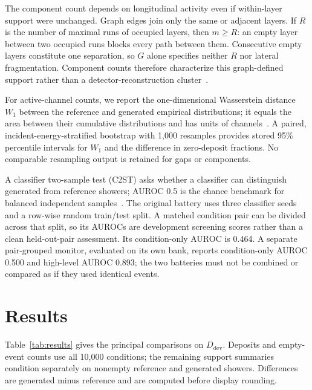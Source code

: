 \documentclass[11pt]{article}
\newcommand{\Ddev}{D_{\mathrm{dev}}}
\begin{document}
The component count depends on longitudinal activity even if within-layer support were unchanged. Graph edges join only the same or adjacent layers. If $R$ is the number of maximal runs of occupied layers, then $m\geq R$: an empty layer between two occupied runs blocks every path between them. Consecutive empty layers constitute one separation, so $G$ alone specifies neither $R$ nor lateral fragmentation. Component counts therefore characterize this graph-defined support rather than a detector-reconstruction cluster~\cite{atlastopocluster}.

For active-channel counts, we report the one-dimensional Wasserstein distance $W_1$ between the reference and generated empirical distributions; it equals the area between their cumulative distributions and has units of channels~\cite{kansalmetrics}. A paired, incident-energy-stratified bootstrap with 1,000 resamples provides stored 95\% percentile intervals for $W_1$ and the difference in zero-deposit fractions. No comparable resampling output is retained for gaps or components.

A classifier two-sample test (C2ST) asks whether a classifier can distinguish generated from reference showers; AUROC 0.5 is the chance benchmark for balanced independent samples~\cite{c2st,kansalmetrics}. The original battery uses three classifier seeds and a row-wise random train/test split. A matched condition pair can be divided across that split, so its AUROCs are development screening scores rather than a clean held-out-pair assessment. Its condition-only AUROC is 0.464. A separate pair-grouped monitor, evaluated on its own bank, reports condition-only AUROC 0.500 and high-level AUROC 0.893; the two batteries must not be combined or compared as if they used identical events.

\clearpage
\section{Results}
\label{sec:results}

Table~\ref{tab:results} gives the principal comparisons on $\Ddev$. Deposits and empty-event counts use all 10,000 conditions; the remaining support summaries condition separately on nonempty reference and generated showers. Differences are generated minus reference and are computed before display rounding.
\end{document}
